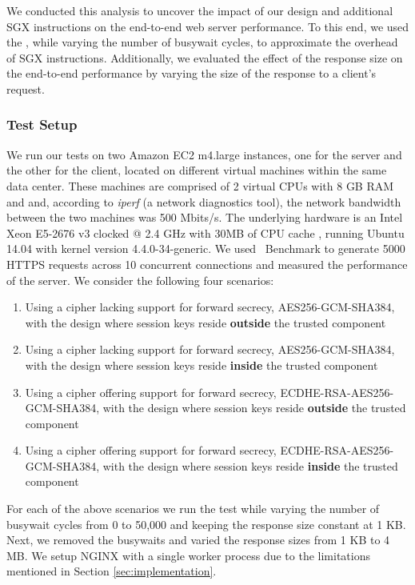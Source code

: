 \documentclass[../../../main.tex]{subfiles}
\begin{document}
\label{sec:endtoend}
We conducted this analysis to uncover the impact of our design and
additional SGX instructions on the end-to-end web server performance.
To this end, we used the \enclavemodel, while varying the
number of busywait cycles, to approximate the overhead of SGX
instructions. Additionally, we evaluated the effect of the response
size on the end-to-end performance by varying the size of the response
to a client's request.

\subsubsection*{Test Setup}
We run our tests on two Amazon EC2 m4.large instances, one for the
server and the other for the client, located on different virtual
machines within the same data center. These machines are comprised of
2 virtual CPUs with 8 GB RAM and and, according to \textit{iperf} (a
network diagnostics tool), the network bandwidth between the two
machines was 500 Mbits/s. The underlying hardware is an Intel Xeon
E5-2676 v3 clocked @ 2.4 GHz with 30MB of CPU cache
\cite{aws_instances}, running Ubuntu 14.04 with kernel version
4.4.0-34-generic. We used \Apache~Benchmark to generate 5000 HTTPS
requests across 10 concurrent connections and measured the performance
of the server. We consider the following four scenarios:
\begin{enumerate}
  \item Using a cipher lacking support for forward secrecy, AES256-GCM-SHA384,
    with the design where session keys reside \textbf{outside} the trusted
    component
  \item Using a cipher lacking support for forward secrecy, AES256-GCM-SHA384,
    with the design where session keys reside \textbf{inside} the trusted
    component
  \item Using a cipher offering support for forward secrecy,
    ECDHE-RSA-AES256-GCM-SHA384, with the design where session keys reside
    \textbf{outside} the trusted component
  \item Using a cipher offering support for forward secrecy,
    ECDHE-RSA-AES256-GCM-SHA384, with the design where session keys reside
    \textbf{inside} the trusted component
\end{enumerate}

For each of the above scenarios we run the test while varying the
number of busywait cycles from 0 to 50,000 and keeping the response
size constant at 1 KB. Next, we removed the busywaits and varied the
response sizes from 1 KB to 4 MB. We setup NGINX with a single worker
process due to the limitations mentioned in Section
\ref{sec:implementation}.
\end{document}
